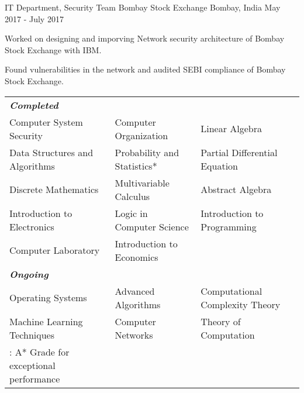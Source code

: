 \documentclass[12pt, a4paper]{awesome-cv}
\begin{document}
\begin{cventries}
    \cventry
    {IT Department, Security Team}
    {Bombay Stock Exchange}
    {Bombay, India}
    {May 2017 - July 2017}
    {
        \begin{cvitems}
            \item Worked on designing and imporving Network security architecture of Bombay Stock Exchange with IBM. 
            \item Found vulnerabilities in the network and audited SEBI compliance of Bombay Stock Exchange. 
        \end{cvitems}
    }
\end{cventries}
\vspace{-0.3cm}
{\fontsize{11pt}{1em}\bodyfontlight\upshape\color{text}
\begin{tabular}{l l l}
\textbf{\textit{Completed}}\\
 Computer System Security & Computer Organization & Linear Algebra\\ 
 Data Structures and Algorithms & Probability and Statistics* & Partial Differential Equation\\
 Discrete Mathematics  & Multivariable Calculus & Abstract Algebra\\
    Introduction to Electronics & Logic in Computer Science & Introduction to Programming \\
 Computer Laboratory & Introduction to Economics\\
 
\textbf{\textit{Ongoing}}\\
    Operating Systems & Advanced Algorithms & Computational Complexity Theory\\
 Machine Learning Techniques & Computer Networks & Theory of Computation\\

 {\footnotesize  * : A* Grade for exceptional performance}\\
 \end{tabular}
 }
\vspace{-0.3cm}
\end{document}

